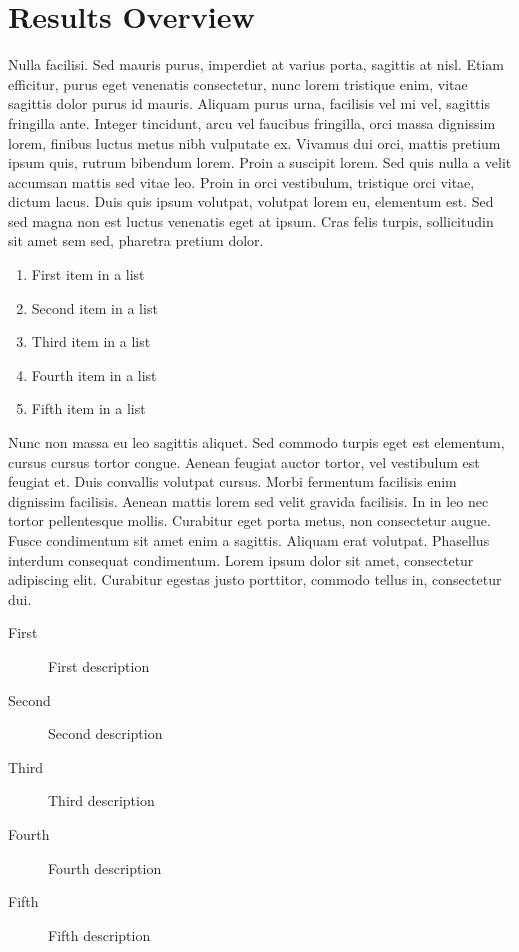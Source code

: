 \documentclass[
10pt, %
a4paper, %
twocolumn, %
landscape %
]{article}
\begin{document}

\section{Results Overview}

Nulla facilisi. Sed mauris purus, imperdiet at varius porta, sagittis at nisl. Etiam efficitur, purus eget venenatis consectetur, nunc lorem tristique enim, vitae sagittis dolor purus id mauris. Aliquam purus urna, facilisis vel mi vel, sagittis fringilla ante. Integer tincidunt, arcu vel faucibus fringilla, orci massa dignissim lorem, finibus luctus metus nibh vulputate ex. Vivamus dui orci, mattis pretium ipsum quis, rutrum bibendum lorem. Proin a suscipit lorem. Sed quis nulla a velit accumsan mattis sed vitae leo. Proin in orci vestibulum, tristique orci vitae, dictum lacus. Duis quis ipsum volutpat, volutpat lorem eu, elementum est. Sed sed magna non est luctus venenatis eget at ipsum. Cras felis turpis, sollicitudin sit amet sem sed, pharetra pretium dolor.

\begin{enumerate}
\item First item in a list
\item Second item in a list
\item Third item in a list
\item Fourth item in a list
\item Fifth item in a list
\end{enumerate}

Nunc non massa eu leo sagittis aliquet. Sed commodo turpis eget est elementum, cursus cursus tortor congue. Aenean feugiat auctor tortor, vel vestibulum est feugiat et. Duis convallis volutpat cursus. Morbi fermentum facilisis enim dignissim facilisis. Aenean mattis lorem sed velit gravida facilisis. In in leo nec tortor pellentesque mollis. Curabitur eget porta metus, non consectetur augue. Fusce condimentum sit amet enim a sagittis. Aliquam erat volutpat. Phasellus interdum consequat condimentum. Lorem ipsum dolor sit amet, consectetur adipiscing elit. Curabitur egestas justo porttitor, commodo tellus in, consectetur dui.

\begin{description}
\item[First] First description
\item[Second] Second description
\item[Third] Third description
\item[Fourth] Fourth description
\item[Fifth] Fifth description
\end{description}
\end{document}

